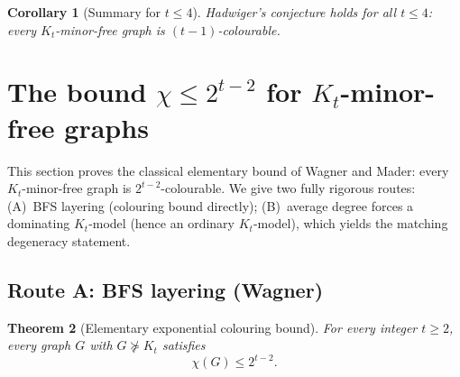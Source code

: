 \documentclass[11pt]{article}
\newtheorem{theorem}{Theorem}[section]
\newtheorem{corollary}[theorem]{Corollary}
\theoremstyle{definition}
\begin{document}
\begin{corollary}[Summary for \(t\le 4\)]\label{cor:t4}
Hadwiger's conjecture holds for all \(t\le 4\): every \(K_t\)-minor-free graph
is \((t-1)\)-colourable.
\end{corollary}

\section{The bound \(\chi\le 2^{t-2}\) for \(K_t\)-minor-free graphs}

This section proves the classical elementary bound of Wagner and Mader: every
\(K_t\)-minor-free graph is \(2^{t-2}\)-colourable. We give two fully rigorous
routes: (A)~BFS layering (colouring bound directly); (B)~average degree forces a
dominating \(K_t\)-model (hence an ordinary \(K_t\)-model), which yields the
matching degeneracy statement.

\subsection{Route A: BFS layering (Wagner)}

\begin{theorem}[Elementary exponential colouring bound]
\label{thm:exp-chi}
For every integer \(t\ge 2\), every graph \(G\) with \(G\not\succcurlyeq K_t\)
satisfies
\[
\chi(G)\le 2^{t-2}.
\]
\end{theorem}
\end{document}
